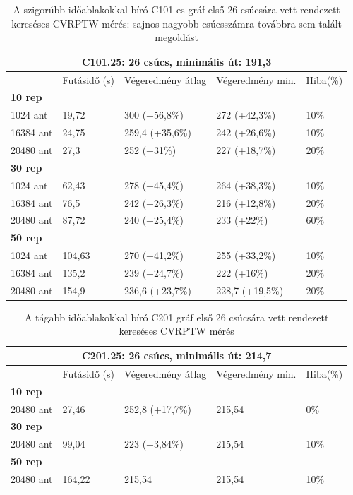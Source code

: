 \begin{table}[ht!]
	\centering
	\begin{tabular}{|p{1.75cm}||p{2cm}|p{3.25cm}|p{3.25cm}|p{1.5cm}|}
		\hline
		\multicolumn{5}{|c|}{C101.25: 26 csúcs, minimális út: 191,3} \\
		\hline
		& Futásidő (s) & Végeredmény átlag & Végeredmény min. & Hiba(\%) \\
		\hline
		\textbf{10 rep} &  &  &  & \\
		1024 ant & 19,72 & 300 (+56,8\%) & 272 (+42,3\%) &  10\% \\
		16384 ant & 24,75 & 259,4 (+35,6\%) & 242 (+26,6\%) &  10\% \\
		20480 ant & 27,3 & 252 (+31\%) & 227 (+18,7\%) &  20\% \\
		\hline
		\textbf{30 rep} &  &  &  & \\
		1024 ant & 62,43 & 278 (+45,4\%) & 264 (+38,3\%) &  10\% \\
		16384 ant & 76,5 & 242 (+26,3\%) & 216 (+12,8\%) &  20\% \\
		20480 ant & 87,72 & 240 (+25,4\%) & 233 (+22\%) &  60\% \\
		\hline
		\textbf{50 rep} &  &  &  &  \\
		1024 ant & 104,63 & 270 (+41,2\%) & 255 (+33,2\%) &  10\% \\
		16384 ant & 135,2 & 239 (+24,7\%) & 222 (+16\%) &  20\% \\
		20480 ant & 154,9 & 236,6 (+23,7\%) & 228,7 (+19,5\%) &  20\% \\
		\hline
	\end{tabular}
	\caption{A szigorúbb időablakokkal bíró C101-es gráf első 26 csúcsára vett rendezett kereséses CVRPTW mérés: sajnos nagyobb csúcsszámra továbbra sem talált megoldást}
	\label{table:VRTPW2_25_1}
\end{table}

\begin{table}[ht!]
	\centering
	\begin{tabular}{|p{1.75cm}||p{2cm}|p{3.25cm}|p{3.25cm}|p{1.5cm}|}
		\hline
		\multicolumn{5}{|c|}{C201.25: 26 csúcs, minimális út: 214,7} \\
		\hline
		& Futásidő (s) & Végeredmény átlag & Végeredmény min. & Hiba(\%) \\
		\hline
		\textbf{10 rep} &  &  &  & \\
		20480 ant & 27,46 & 252,8 (+17,7\%) & 215,54 &  0\% \\
		\hline
		\textbf{30 rep} &  &  &  & \\
		20480 ant & 99,04 & 223 (+3,84\%) & 215,54 &  10\% \\
		\hline
		\textbf{50 rep} &  &  &  &  \\
		20480 ant & 164,22 & 215,54 & 215,54 &  10\% \\
		\hline
	\end{tabular}
	\caption{A tágabb időablakokkal bíró C201 gráf első 26 csúcsára vett rendezett kereséses CVRPTW mérés}
	\label{table:VRTPW2_25_2}
\end{table}

